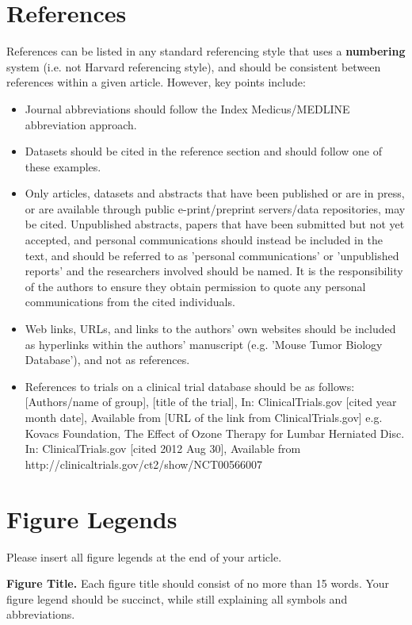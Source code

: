\documentclass[10pt]{article}
\begin{document}
\section{References}
References can be listed in any standard referencing style that uses a {\bf numbering} system (i.e. not Harvard referencing style), and should be consistent between references within a given article. However, key points include:
\begin{itemize}
\item Journal abbreviations should follow the Index Medicus/MEDLINE abbreviation approach.
\end{itemize}
\begin{itemize}
\item Datasets should be cited in the reference section and should follow one of these examples.
\end{itemize}
\begin{itemize}
\item Only articles, datasets and abstracts that have been published or are in press, or are available through public e-print/preprint servers/data repositories, may be cited. Unpublished abstracts, papers that have been submitted but not yet accepted, and personal communications should instead be included in the text, and should be referred to as {'}personal communications{'} or {'}unpublished reports{'} and the researchers involved should be named. It is the responsibility of the authors to ensure they obtain permission to quote any personal communications from the cited individuals.
\end{itemize}
\begin{itemize}
\item Web links, URLs, and links to the authors{'} own websites should be included as hyperlinks within the authors' manuscript (e.g. 'Mouse Tumor Biology Database'), and not as references.
\end{itemize}
\begin{itemize}
\item References to trials on a clinical trial database should be as follows:
[Authors/name of group], [title of the trial], In: ClinicalTrials.gov [cited year month date], Available from [URL of the link from ClinicalTrials.gov] e.g. Kovacs Foundation, The Effect of Ozone Therapy for Lumbar Herniated Disc. In: ClinicalTrials.gov [cited 2012 Aug 30], Available from http://clinicaltrials.gov/ct2/show/NCT00566007
\end{itemize}


\section*{Figure Legends}
Please insert all figure legends at the end of your article.

\textbf{\label{fig:fig1} Figure Title.} Each figure title should consist of no more than 15 words. Your figure legend should be succinct, while still explaining all symbols and abbreviations.



\end{document}
